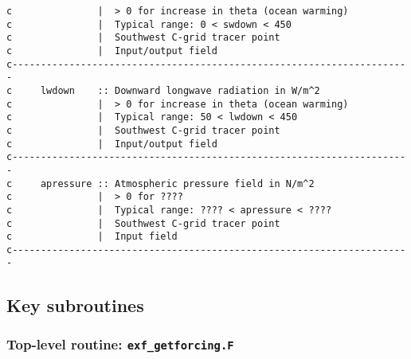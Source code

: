 {\begin{verbatim}
c               |  > 0 for increase in theta (ocean warming)
c               |  Typical range: 0 < swdown < 450
c               |  Southwest C-grid tracer point
c               |  Input/output field
c----------------------------------------------------------------------
c     lwdown    :: Downward longwave radiation in W/m^2
c               |  > 0 for increase in theta (ocean warming)
c               |  Typical range: 50 < lwdown < 450
c               |  Southwest C-grid tracer point
c               |  Input/output field
c----------------------------------------------------------------------
c     apressure :: Atmospheric pressure field in N/m^2
c               |  > 0 for ????
c               |  Typical range: ???? < apressure < ????
c               |  Southwest C-grid tracer point
c               |  Input field
c----------------------------------------------------------------------

\end{verbatim}
}


\subsection{Key subroutines
\label{sec:pkg:exf:subroutines}}

\subsubsection{Top-level routine: \texttt{exf\_getforcing.F}}


